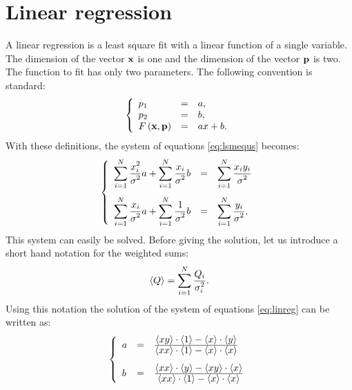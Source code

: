\section{Linear regression}
A linear regression is a least square fit with a linear function
of a single variable.
The dimension of the vector ${\textbf x}$ is one
and the dimension of the vector ${\textbf p}$ is two. The function to
fit has only two parameters. The following convention is standard:
\begin{equation}
  \left\{
  \begin{array}{lcl}
    p_1 & = & a, \\
    p_2 & = & b, \\
    F\left({\textbf x},{\textbf p}\right)&=&ax+b.
  \end{array}
  \right.
\end{equation}
With these definitions, the system of equations \ref{eq:lsmequs}
becomes:
\begin{equation}
\label{eq:linreg}
  \left\{
  \begin{array}{lcl}
    \displaystyle \sum_{i=1}^N {\displaystyle x_i^2\over\displaystyle\sigma^2}a
    + \sum_{i=1}^N {\displaystyle x_i\over\displaystyle\sigma^2}b& = &
    \displaystyle\sum_{i=1}^N {\displaystyle x_i y_i\over\displaystyle\sigma^2}
    \\*[4ex]
    \displaystyle\sum_{i=1}^N {\displaystyle x_i\over\displaystyle\sigma^2}a
    + \sum_{i=1}^N {\displaystyle 1\over\displaystyle\sigma^2}b& = &
    \displaystyle\sum_{i=1}^N {\displaystyle y_i\over\displaystyle\sigma^2}.
  \end{array}
  \right.
\end{equation}
This system can easily be solved. Before giving the solution, let
us introduce a short hand notation for the weighted sums:
\begin{equation}
\left\langle Q\right\rangle = \sum_{i=1}^N {\displaystyle
Q_i\over\displaystyle\sigma^2_i}.
\end{equation}
Using this notation the solution of the system of equations
\ref{eq:linreg} can be written as:
\begin{equation}
  \left\{
  \begin{array}{lcl}
    a& = & {\displaystyle\left\langle xy\right\rangle\cdot\left\langle 1\right\rangle-\left\langle x\right\rangle\cdot\left\langle y\right\rangle
       \over\displaystyle\left\langle xx\right\rangle\cdot\left\langle 1\right\rangle-\left\langle x\right\rangle\cdot\left\langle x\right\rangle}
    \\*[3ex]
    b& = & {\displaystyle\left\langle xx\right\rangle\cdot\left\langle y\right\rangle-\left\langle xy\right\rangle\cdot\left\langle x\right\rangle
       \over\displaystyle\left\langle xx\right\rangle\cdot\left\langle 1\right\rangle-\left\langle x\right\rangle\cdot\left\langle x\right\rangle}
  \end{array}
  \right.
\end{equation}
